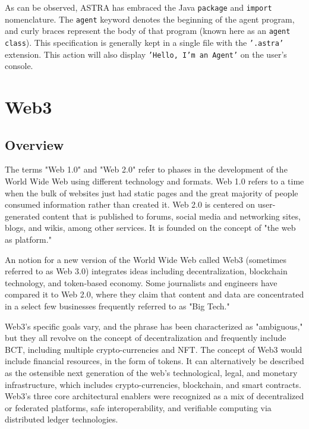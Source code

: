 \vspace{.5cm}

As can be observed, ASTRA has embraced the Java \texttt{package} and \texttt{import} nomenclature. The \texttt{agent} keyword denotes the beginning of the agent program, and curly braces represent the body of that program (known here as an \texttt{agent class}). This specification is generally kept in a single file with the \texttt{'.astra'} extension. This action will also display \texttt{'Hello, I'm an Agent'} on the user's console.

\section{Web3}

\subsection{Overview}
The terms "Web 1.0" and "Web 2.0" refer to phases in the development of the World Wide Web using different technology and formats. Web 1.0 refers to a time when the bulk of websites just had static pages and the great majority of people consumed information rather than created it. Web 2.0 is centered on user-generated content that is published to forums, social media and networking sites, blogs, and wikis, among other services. It is founded on the concept of "the web as platform."

\vspace{.5cm}

An notion for a new version of the World Wide Web called Web3 (sometimes referred to as Web 3.0) integrates ideas including decentralization, blockchain technology, and token-based economy. Some journalists and engineers have compared it to Web 2.0, where they claim that content and data are concentrated in a select few businesses frequently referred to as "Big Tech."

\vspace{.5cm}

Web3's specific goals vary, and the phrase has been characterized as "ambiguous," but they all revolve on the concept of decentralization and frequently include \ac{BCT}, including multiple crypto-currencies and \ac{NFT}. The concept of Web3 would include financial resources, in the form of tokens. It can alternatively be described as the ostensible next generation of the web's technological, legal, and monetary infrastructure, which includes crypto-currencies, blockchain, and smart contracts. Web3's three core architectural enablers were recognized as a mix of decentralized or federated platforms, safe interoperability, and verifiable computing via distributed ledger technologies.

